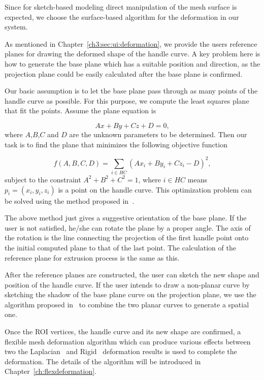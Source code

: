 Since for sketch-based modeling direct manipulation of the mesh surface is expected, we choose the surface-based algorithm for the deformation in our system.

As mentioned in Chapter~\ref{ch3:sec:ui:deformation}, we provide the users reference planes for drawing the deformed shape of the handle curve. A key problem here is how to generate the base plane which has a suitable position and direction, as the projection plane could be easily calculated after the base plane is confirmed.

Our basic assumption is to let the base plane pass through as many points of the handle curve as possible. For this purpose, we compute the least squares plane that fit the points. Assume the plane equation is

\begin{equation}
\label{eq:planefunc}
	Ax+By+Cz+D=0,\nonumber
\end{equation}
where $A$,$B$,$C$ and $D$ are the unknown parameters to be determined. Then our task is to find the plane that minimizes the following objective function

\begin{equation}
\label{eq:planeobjnoZ0}
	f(A,B,C,D)=\sum\limits_{i \in HC} {(Ax_i+By_i+Cz_i-D)^2},
\end{equation}
subject to the constraint $A^2+B^2+C^2=1$, where $i \in HC$ means $p_i=(x_i,y_i,z_i)$ is a point on the handle curve. This optimization problem can be solved using the method proposed in~\cite{SWMB59}.

The above method just gives a suggestive orientation of the base plane. If the user is not satisfied, he/she can rotate the plane by a proper angle. The axis of the rotation is the line connecting the projection of the first handle point onto the initial computed plane to that of the last point. The calculation of the reference plane for extrusion process is the same as this.

After the reference planes are constructed, the user can sketch the new shape and position of the handle curve. If the user intends to draw a non-planar curve by sketching the shadow of the base plane curve on the projection plane, we use the algorithm proposed in~\cite{CMZHB99} to combine the two planar curves to generate a spatial one.

Once the ROI vertices, the handle curve and its new shape are confirmed, a flexible mesh deformation algorithm which can produce various effects between two the Laplacian~\cite{SCLARS04} and Rigid~\cite{SA07} deformation results is used to complete the deformation. The details of the algorithm will be introduced in Chapter~\ref{ch:flexdeformation}.

